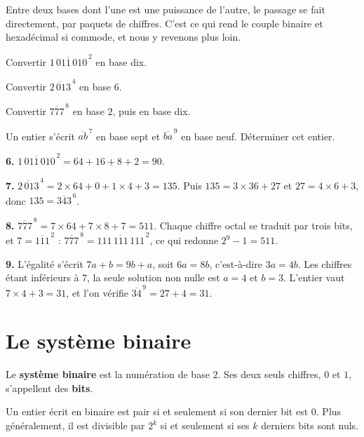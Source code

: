 \begin{remarque}
Entre deux bases dont l'une est une puissance de l'autre, le passage se fait
directement, par paquets de chiffres. C'est ce qui rend le couple binaire et
hexadécimal si commode, et nous y revenons plus loin.
\end{remarque}

\begin{entrainement}[conversions]
\exo[\niveau{1}] Convertir $\overline{1\,011\,010}^{\,2}$ en base dix.

\exo[\niveau{2}] Convertir $\overline{2\,013}^{\,4}$ en base $6$.

\exo[\niveau{2}] Convertir $\overline{777}^{\,8}$ en base $2$, puis en base
dix.

\exo[\niveau{3}] Un entier s'écrit $\overline{ab}^{\,7}$ en base sept et
$\overline{ba}^{\,9}$ en base neuf. Déterminer cet entier.
\end{entrainement}

\begin{corrige}
\textbf{6.} $\overline{1\,011\,010}^{\,2} = 64+16+8+2 = 90$.

\textbf{7.} $\overline{2\,013}^{\,4} = 2\times64+0+1\times4+3 = 135$. Puis
$135 = 3\times36+27$ et $27 = 4\times6+3$, donc
$135 = \overline{343}^{\,6}$.

\textbf{8.} $\overline{777}^{\,8} = 7\times64+7\times8+7 = 511$. Chaque
chiffre octal se traduit par trois bits, et $7 = \overline{111}^{\,2}$ :
$\overline{777}^{\,8} = \overline{111\,111\,111}^{\,2}$, ce qui redonne
$2^{9}-1 = 511$.

\textbf{9.} L'égalité s'écrit $7a+b = 9b+a$, soit $6a = 8b$, c'est-à-dire
$3a = 4b$. Les chiffres étant inférieurs à $7$, la seule solution non nulle
est $a = 4$ et $b = 3$. L'entier vaut $7\times4+3 = 31$, et l'on vérifie
$\overline{34}^{\,9} = 27+4 = 31$.
\end{corrige}

\section{Le système binaire}

\begin{definition}
Le \textbf{système binaire} est la numération de base $2$. Ses deux seuls
chiffres, $0$ et $1$, s'appellent des \textbf{bits}.
\end{definition}

\begin{propriete}
Un entier écrit en binaire est pair si et seulement si son dernier bit est
$0$. Plus généralement, il est divisible par $2^{k}$ si et seulement si ses
$k$ derniers bits sont nuls.
\end{propriete}


